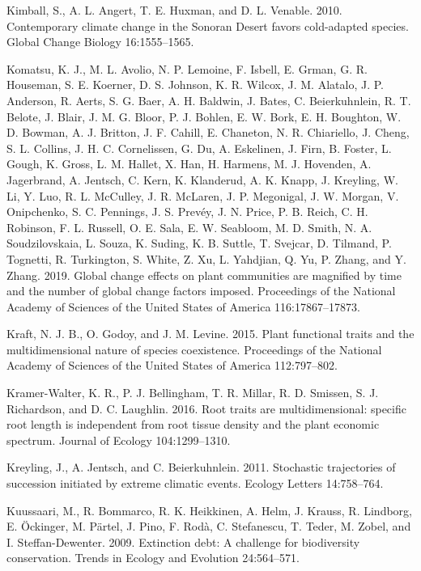 \documentclass[twoside,12pt,final]{ucthesis-CA2012}
\newlength{\cslhangindent}
\newenvironment{cslreferences}%
  {\setlength{\parindent}{0pt}%
  \everypar{\setlength{\hangindent}{\cslhangindent}}\ignorespaces}%
  {\par}
\begin{document}
\begin{ucmainmatter}
\begin{cslreferences}
\leavevmode\hypertarget{ref-Kimball2010}{}%
Kimball, S., A. L. Angert, T. E. Huxman, and D. L. Venable. 2010. Contemporary climate change in the Sonoran Desert favors cold-adapted species. Global Change Biology 16:1555--1565.

\leavevmode\hypertarget{ref-Komatsu2019}{}%
Komatsu, K. J., M. L. Avolio, N. P. Lemoine, F. Isbell, E. Grman, G. R. Houseman, S. E. Koerner, D. S. Johnson, K. R. Wilcox, J. M. Alatalo, J. P. Anderson, R. Aerts, S. G. Baer, A. H. Baldwin, J. Bates, C. Beierkuhnlein, R. T. Belote, J. Blair, J. M. G. Bloor, P. J. Bohlen, E. W. Bork, E. H. Boughton, W. D. Bowman, A. J. Britton, J. F. Cahill, E. Chaneton, N. R. Chiariello, J. Cheng, S. L. Collins, J. H. C. Cornelissen, G. Du, A. Eskelinen, J. Firn, B. Foster, L. Gough, K. Gross, L. M. Hallet, X. Han, H. Harmens, M. J. Hovenden, A. Jagerbrand, A. Jentsch, C. Kern, K. Klanderud, A. K. Knapp, J. Kreyling, W. Li, Y. Luo, R. L. McCulley, J. R. McLaren, J. P. Megonigal, J. W. Morgan, V. Onipchenko, S. C. Pennings, J. S. Prevéy, J. N. Price, P. B. Reich, C. H. Robinson, F. L. Russell, O. E. Sala, E. W. Seabloom, M. D. Smith, N. A. Soudzilovskaia, L. Souza, K. Suding, K. B. Suttle, T. Svejcar, D. Tilmand, P. Tognetti, R. Turkington, S. White, Z. Xu, L. Yahdjian, Q. Yu, P. Zhang, and Y. Zhang. 2019. Global change effects on plant communities are magnified by time and the number of global change factors imposed. Proceedings of the National Academy of Sciences of the United States of America 116:17867--17873.

\leavevmode\hypertarget{ref-Kraft2015}{}%
Kraft, N. J. B., O. Godoy, and J. M. Levine. 2015. Plant functional traits and the multidimensional nature of species coexistence. Proceedings of the National Academy of Sciences of the United States of America 112:797--802.

\leavevmode\hypertarget{ref-Kramer-Walter2016}{}%
Kramer-Walter, K. R., P. J. Bellingham, T. R. Millar, R. D. Smissen, S. J. Richardson, and D. C. Laughlin. 2016. Root traits are multidimensional: specific root length is independent from root tissue density and the plant economic spectrum. Journal of Ecology 104:1299--1310.

\leavevmode\hypertarget{ref-Kreyling2011}{}%
Kreyling, J., A. Jentsch, and C. Beierkuhnlein. 2011. Stochastic trajectories of succession initiated by extreme climatic events. Ecology Letters 14:758--764.

\leavevmode\hypertarget{ref-kuussaari2009}{}%
Kuussaari, M., R. Bommarco, R. K. Heikkinen, A. Helm, J. Krauss, R. Lindborg, E. Öckinger, M. Pärtel, J. Pino, F. Rodà, C. Stefanescu, T. Teder, M. Zobel, and I. Steffan-Dewenter. 2009. Extinction debt: A challenge for biodiversity conservation. Trends in Ecology and Evolution 24:564--571.


\end{cslreferences}
\end{ucmainmatter}
\end{document}
